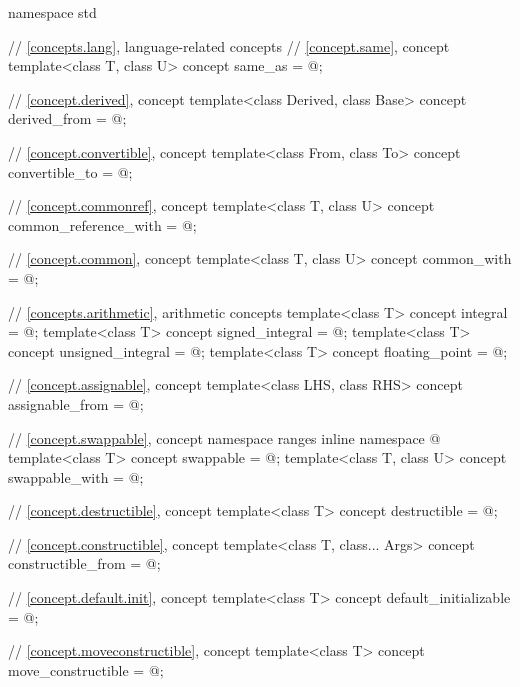 %
\begin{codeblock}
namespace std {
  // \ref{concepts.lang}, language-related concepts
  // \ref{concept.same}, concept 
  template<class T, class U>
    concept same_as = @\seebelow@;

  // \ref{concept.derived}, concept 
  template<class Derived, class Base>
    concept derived_from = @\seebelow@;

  // \ref{concept.convertible}, concept 
  template<class From, class To>
    concept convertible_to = @\seebelow@;

  // \ref{concept.commonref}, concept 
  template<class T, class U>
    concept common_reference_with = @\seebelow@;

  // \ref{concept.common}, concept 
  template<class T, class U>
    concept common_with = @\seebelow@;

  // \ref{concepts.arithmetic}, arithmetic concepts
  template<class T>
    concept integral = @\seebelow@;
  template<class T>
    concept signed_integral = @\seebelow@;
  template<class T>
    concept unsigned_integral = @\seebelow@;
  template<class T>
    concept floating_point = @\seebelow@;

  // \ref{concept.assignable}, concept 
  template<class LHS, class RHS>
    concept assignable_from = @\seebelow@;

  // \ref{concept.swappable}, concept 
  namespace ranges {
    inline namespace @
  }
  template<class T>
    concept swappable = @\seebelow@;
  template<class T, class U>
    concept swappable_with = @\seebelow@;

  // \ref{concept.destructible}, concept 
  template<class T>
    concept destructible = @\seebelow@;

  // \ref{concept.constructible}, concept 
  template<class T, class... Args>
    concept constructible_from = @\seebelow@;

  // \ref{concept.default.init}, concept 
  template<class T>
    concept default_initializable = @\seebelow@;

  // \ref{concept.moveconstructible}, concept 
  template<class T>
    concept move_constructible = @\seebelow@;

}
\end{codeblock}
